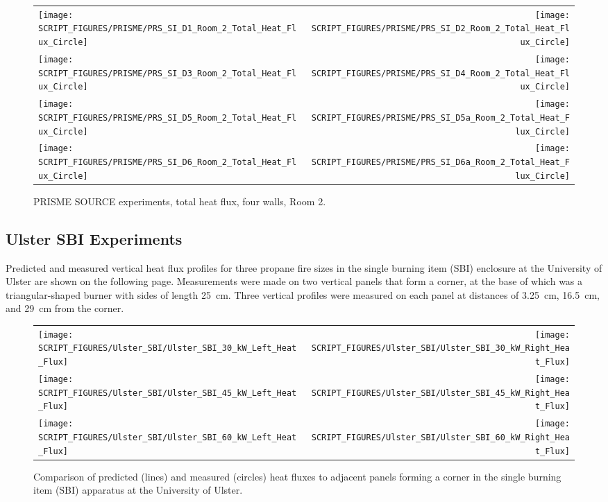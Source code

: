 \begin{figure}[p]
\begin{tabular*}{\textwidth}{l@{\extracolsep{\fill}}r}
\texttt{[image: SCRIPT\_FIGURES/PRISME/PRS\_SI\_D1\_Room\_2\_Total\_Heat\_Flux\_Circle]} &
\texttt{[image: SCRIPT\_FIGURES/PRISME/PRS\_SI\_D2\_Room\_2\_Total\_Heat\_Flux\_Circle]} \\
\texttt{[image: SCRIPT\_FIGURES/PRISME/PRS\_SI\_D3\_Room\_2\_Total\_Heat\_Flux\_Circle]} &
\texttt{[image: SCRIPT\_FIGURES/PRISME/PRS\_SI\_D4\_Room\_2\_Total\_Heat\_Flux\_Circle]} \\
\texttt{[image: SCRIPT\_FIGURES/PRISME/PRS\_SI\_D5\_Room\_2\_Total\_Heat\_Flux\_Circle]} &
\texttt{[image: SCRIPT\_FIGURES/PRISME/PRS\_SI\_D5a\_Room\_2\_Total\_Heat\_Flux\_Circle]} \\
\texttt{[image: SCRIPT\_FIGURES/PRISME/PRS\_SI\_D6\_Room\_2\_Total\_Heat\_Flux\_Circle]} &
\texttt{[image: SCRIPT\_FIGURES/PRISME/PRS\_SI\_D6a\_Room\_2\_Total\_Heat\_Flux\_Circle]}
\end{tabular*}
\caption[PRISME SOURCE experiments, total heat flux, four walls, Room 2]{PRISME SOURCE experiments, total heat flux, four walls, Room 2.}
\label{PRISME_SOURCE_Wall_Circle_THF_Room_2}
\end{figure}

\clearpage


\subsection{Ulster SBI Experiments}

Predicted and measured vertical heat flux profiles for three propane fire sizes in the single burning item (SBI) enclosure at the University of Ulster are shown on the following page. Measurements were made on two vertical panels that form a corner, at the base of which was a triangular-shaped burner with sides of length 25~cm. Three vertical profiles were measured on each panel at distances of 3.25~cm, 16.5~cm, and 29~cm from the corner.

\begin{figure}[h!]
\begin{tabular*}{\textwidth}{l@{\extracolsep{\fill}}r}
\texttt{[image: SCRIPT\_FIGURES/Ulster\_SBI/Ulster\_SBI\_30\_kW\_Left\_Heat\_Flux]} &
\texttt{[image: SCRIPT\_FIGURES/Ulster\_SBI/Ulster\_SBI\_30\_kW\_Right\_Heat\_Flux]} \\
\texttt{[image: SCRIPT\_FIGURES/Ulster\_SBI/Ulster\_SBI\_45\_kW\_Left\_Heat\_Flux]} &
\texttt{[image: SCRIPT\_FIGURES/Ulster\_SBI/Ulster\_SBI\_45\_kW\_Right\_Heat\_Flux]} \\
\texttt{[image: SCRIPT\_FIGURES/Ulster\_SBI/Ulster\_SBI\_60\_kW\_Left\_Heat\_Flux]} &
\texttt{[image: SCRIPT\_FIGURES/Ulster\_SBI/Ulster\_SBI\_60\_kW\_Right\_Heat\_Flux]}
\end{tabular*}
\label{Ulster_SBI}
\caption[Ulster SBI experiments, corner fire heat flux]
{Comparison of predicted (lines) and measured (circles) heat fluxes to adjacent panels forming a corner in the single
burning item (SBI) apparatus at the University of Ulster.}
\end{figure}

